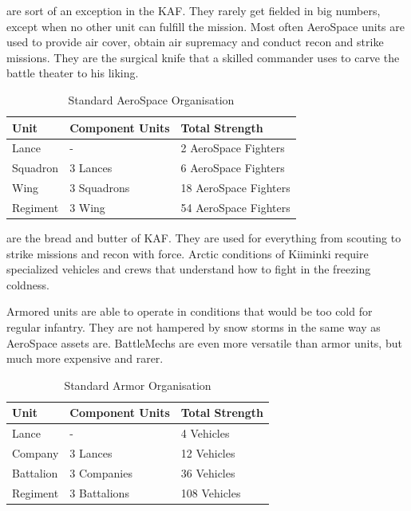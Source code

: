\documentclass{tufte-book}
\begin{document}
 are sort of an exception in the KAF. 
They rarely get fielded in big numbers, except when no other unit can
fulfill the mission. Most often AeroSpace units are used to provide air
cover, obtain air supremacy and conduct recon and strike missions. They
are the surgical knife that a skilled commander uses to carve the battle
theater to his liking.

\bigskip
\begin{table}
\begin{minipage}{\textwidth}
\begin{center}
\begin{tabular}{lll}
\toprule
Unit & Component Units & Total Strength \\
\midrule
Lance    & -           & 2 AeroSpace Fighters \\
Squadron & 3 Lances    & 6 AeroSpace Fighters \\
Wing     & 3 Squadrons & 18 AeroSpace Fighters \\
Regiment & 3 Wing      & 54 AeroSpace Fighters \\
\bottomrule
\end{tabular}
\end{center}
\end{minipage}
\caption{Standard AeroSpace Organisation}
\end{table}

 are the bread and butter of KAF. 
They are used for everything from scouting to strike missions and recon 
with force. Arctic conditions of Kiiminki require specialized vehicles 
and crews that understand how to fight in the freezing coldness.

Armored units are able to operate in conditions that would be too cold
for regular infantry. They are not hampered by snow storms in the same
way as AeroSpace assets are. BattleMechs are even more versatile than
armor units, but much more expensive and rarer.

\bigskip
\begin{table}
\begin{minipage}{\textwidth}
\begin{center}
\begin{tabular}{lll}
\toprule
Unit & Component Units & Total Strength \\
\midrule
Lance     & -            & 4 Vehicles \\
Company   & 3 Lances     & 12 Vehicles \\
Battalion & 3 Companies  & 36 Vehicles \\
Regiment  & 3 Battalions & 108 Vehicles \\
\bottomrule
\end{tabular}
\end{center}
\end{minipage}
\caption{Standard Armor Organisation}
\end{table}
\end{document}
